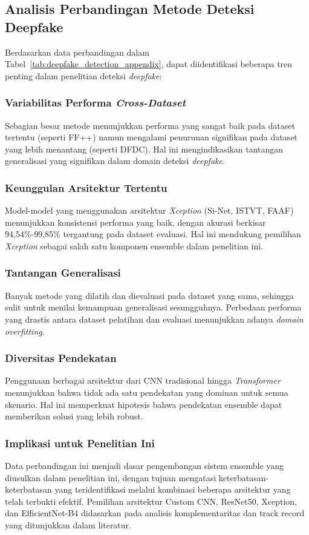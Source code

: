 \subsection{Analisis Perbandingan Metode Deteksi Deepfake}

Berdasarkan data perbandingan dalam Tabel~\ref{tab:deepfake_detection_appendix}, dapat diidentifikasi beberapa tren penting dalam penelitian deteksi \textit{deepfake}:

\subsubsection{Variabilitas Performa \textit{Cross-Dataset}}
Sebagian besar metode menunjukkan performa yang sangat baik pada dataset tertentu (seperti FF++) namun mengalami penurunan signifikan pada dataset yang lebih menantang (seperti DFDC). Hal ini mengindikasikan tantangan generalisasi yang signifikan dalam domain deteksi \textit{deepfake}.

\subsubsection{Keunggulan Arsitektur Tertentu}
Model-model yang menggunakan arsitektur \textit{Xception} (Si-Net, ISTVT, FAAF) menunjukkan konsistensi performa yang baik, dengan akurasi berkisar 94,54\%-99,85\% tergantung pada dataset evaluasi. Hal ini mendukung pemilihan \textit{Xception} sebagai salah satu komponen ensemble dalam penelitian ini.

\subsubsection{Tantangan Generalisasi}
Banyak metode yang dilatih dan dievaluasi pada dataset yang sama, sehingga sulit untuk menilai kemampuan generalisasi sesungguhnya. Perbedaan performa yang drastis antara dataset pelatihan dan evaluasi menunjukkan adanya \textit{domain overfitting}.

\subsubsection{Diversitas Pendekatan}
Penggunaan berbagai arsitektur dari CNN tradisional hingga \textit{Transformer} menunjukkan bahwa tidak ada satu pendekatan yang dominan untuk semua skenario. Hal ini memperkuat hipotesis bahwa pendekatan ensemble dapat memberikan solusi yang lebih robust.

\subsubsection{Implikasi untuk Penelitian Ini}
Data perbandingan ini menjadi dasar pengembangan sistem ensemble yang diusulkan dalam penelitian ini, dengan tujuan mengatasi keterbatasan-keterbatasan yang teridentifikasi melalui kombinasi beberapa arsitektur yang telah terbukti efektif. Pemilihan arsitektur Custom CNN, ResNet50, Xception, dan EfficientNet-B4 didasarkan pada analisis komplementaritas dan track record yang ditunjukkan dalam literatur.

